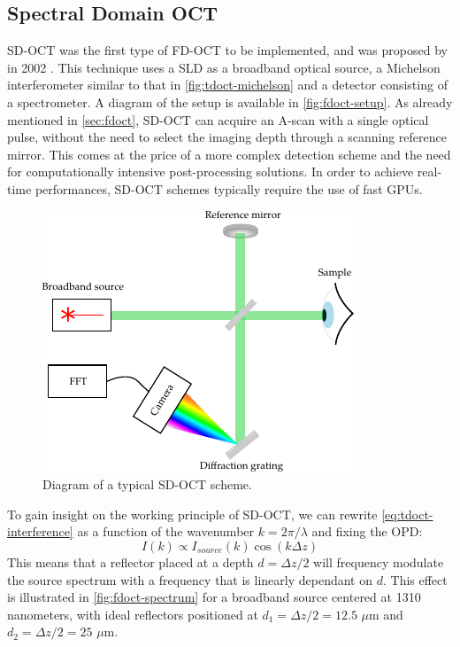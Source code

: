 \subsection{Spectral Domain OCT}
\ac{SD-OCT} was the first type of \ac{FD-OCT} to be implemented, and was proposed by \citeauthor{Wojtkowski2002} in 2002 \cite{Wojtkowski2002}. This technique uses a \ac{SLD} as a broadband optical source, a Michelson interferometer similar to that in \autoref{fig:tdoct-michelson} and a detector consisting of a spectrometer. A diagram of the setup is available in \autoref{fig:fdoct-setup}. As already mentioned in \autoref{sec:fdoct}, \ac{SD-OCT} can acquire an A-scan with a single optical pulse, without the need to select the imaging depth through a scanning reference mirror. This comes at the price of a more complex detection scheme and the need for computationally intensive post-processing solutions. In order to achieve real-time performances, \ac{SD-OCT} schemes typically require the use of fast \acp{GPU}. 

\begin{figure}[hbt]
	\myfloatalign
	\includegraphics[width=0.75\linewidth]{gfx/ch2/fdoct-setup}
	\caption{Diagram of a typical \ac{SD-OCT} scheme.}\label{fig:fdoct-setup}
\end{figure}


To gain insight on the working principle of \ac{SD-OCT}, we can rewrite \autoref{eq:tdoct-interference} as a function of the wavenumber $k = 2\pi/\lambda$ and fixing the \ac{OPD}:
\begin{equation}
	I(k) \propto I_{source}(k)\cos\left(k \Delta z\right)
\end{equation}
This means that a reflector placed at a depth $d = \Delta z/2$ will frequency modulate the source spectrum with a frequency that is linearly dependant on $d$. This effect is illustrated in \autoref{fig:fdoct-spectrum} for a broadband source centered at 1310 nanometers, with ideal reflectors positioned at $d_1 = \Delta z/2 = 12.5$ $\mu$m and $d_2 = \Delta z/2 = 25$ $\mu$m. 

